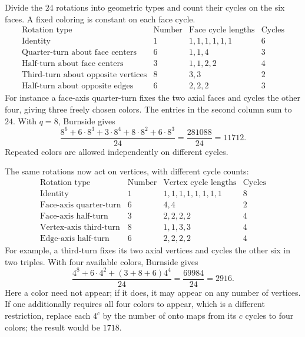 \idea Divide the $24$ rotations into geometric types and count their cycles
on the six faces. A fixed coloring is constant on each face cycle.
\[
\begin{array}{l|r|c|r}
\text{Rotation type}&\text{Number}&\text{Face cycle lengths}&\text{Cycles}\\\hline
\text{Identity}&1&1,1,1,1,1,1&6\\
\text{Quarter-turn about face centers}&6&1,1,4&3\\
\text{Half-turn about face centers}&3&1,1,2,2&4\\
\text{Third-turn about opposite vertices}&8&3,3&2\\
\text{Half-turn about opposite edges}&6&2,2,2&3
\end{array}
\]
For instance a face-axis quarter-turn fixes the two axial faces and cycles
the other four, giving three freely chosen colors. The entries in the
second column sum to $24$. With $q=8$, Burnside gives
\[
\frac{8^6+6\cdot8^3+3\cdot8^4+8\cdot8^2+6\cdot8^3}{24}
=\frac{281088}{24}=\boxed{11712}.
\]
Repeated colors are allowed independently on different cycles.

The same rotations now act on vertices, with different cycle counts:
\[
\begin{array}{l|r|c|r}
\text{Rotation type}&\text{Number}&\text{Vertex cycle lengths}&\text{Cycles}\\\hline
\text{Identity}&1&1,1,1,1,1,1,1,1&8\\
\text{Face-axis quarter-turn}&6&4,4&2\\
\text{Face-axis half-turn}&3&2,2,2,2&4\\
\text{Vertex-axis third-turn}&8&1,1,3,3&4\\
\text{Edge-axis half-turn}&6&2,2,2,2&4
\end{array}
\]
For example, a third-turn fixes its two axial vertices and cycles the
other six in two triples. With four available colors, Burnside gives
\[
\frac{4^8+6\cdot4^2+(3+8+6)4^4}{24}
=\frac{69984}{24}=\boxed{2916}.
\]
Here a color need not appear; if it does, it may appear on any number of
vertices. If one additionally requires all four colors to appear, which
is a different restriction, replace each $4^c$ by the number of onto maps
from its $c$ cycles to four colors; the result would be $1718$.

